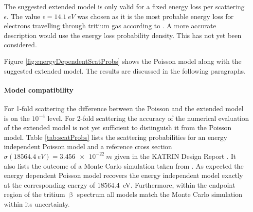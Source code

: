 The suggested extended model is only valid for a fixed energy loss per scattering $\epsilon$. The value $\epsilon=\SI{14.1}{eV}$ was chosen as it is the most probable energy loss for electrons travelling through tritium gas according to \cite{Aseev2000}. A more accurate description would use the energy loss probability density. This has not yet been considered.

Figure \ref{fig:energyDependentScatProbs} shows the Poisson model along with the suggested extended model. The results are discussed in the following paragraphs.


\paragraph{Model compatibility}
 For 1-fold scattering the difference between the Poisson and the extended model is on the $10^{-4}$ level. For 2-fold scattering the accuracy of the numerical evaluation of the extended model is not yet sufficient to distinguish it from the Poisson model. Table \ref{tab:scatProbs} lists the scattering probabilities for an energy independent Poisson model and a reference cross section $\sigma(\SI{18564.4}{eV})=\SI{3.456e-22}{m}$ given in the KATRIN Design Report \cite{Angrik:2005ep}. It also lists the outcome of a Monte Carlo simulation taken from \cite{Groh2015}. As expected the energy dependent Poisson model recovers the energy independent model exactly at the corresponding energy of \SI{18564.4}{eV}. Furthermore, within the endpoint region of the tritium $\upbeta$ spectrum all models match the Monte Carlo simulation within its uncertainty.

